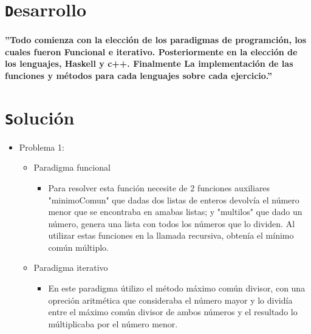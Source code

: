 \documentclass[10pt]{article}
\begin{document}
\begin{titlepage}
\begin{flushleft}
\begin{itemize}
		\end{itemize}
		
		\section{\texttt Desarrollo}
		\paragraph{''Todo comienza con la elección de los paradigmas de programción, los cuales fueron Funcional e iterativo. Posteriormente en la elección de los lenguajes, Haskell y c++. Finalmente La implementación de las funciones y métodos para cada lenguajes sobre cada ejercicio.''}

		\section{\texttt Solución}
		\begin{itemize}
			\item Problema 1:
			\begin{itemize}
				\item Paradigma funcional
				\begin{itemize}
					\item Para resolver esta función necesite de 2 funciones auxiliares "minimoComun" que dadas dos listas de enteros devolvía el número menor que se encontraba en amabas listas; y "multilos" que dado un número, genera una lista con todos los números que lo dividen. Al utilizar estas funciones en la llamada recursiva, obtenía el mínimo común múltiplo.
				\end{itemize}
				\item Paradigma iterativo
				\begin{itemize}
					\item En este paradigma útilizo el método máximo común divisor, con una opreción aritmética que consideraba el número mayor y lo dividía entre el máximo común divisor de ambos números y el resultado lo múltiplicaba por el número menor.
				\end{itemize}
			\end{itemize}


\end{itemize}
\end{flushleft}
\end{titlepage}
\end{document}
